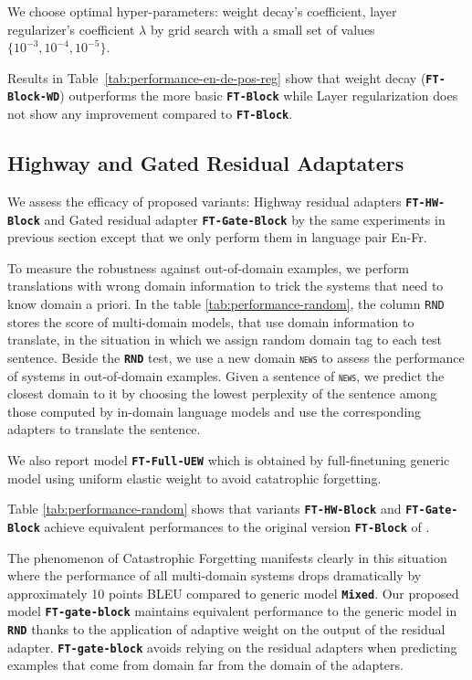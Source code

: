 \documentclass[11pt,a4paper]{article}
\newcommand{\fyTodo}[1]{\Todo[FY:]{\textcolor{orange}{#1}}}
\newcommand{\domain}[1]{\texttt{\textsc{#1}}}
\newcommand{\system}[1]{\texttt{\textbf{#1}}}
\begin{document}
We choose optimal hyper-parameters: weight decay's coefficient, layer regularizer's coefficient $\lambda$ by grid search with a small set of values $\{ 10^{-3}, 10^{-4}, 10^{-5} \}$.

Results in Table~\ref{tab:performance-en-de-pos-reg} show that weight decay (\system{FT-Block-WD}) outperforms the more basic \system{FT-Block} while Layer regularization does not show any improvement compared to \system{FT-Block}.
\fyTodo{How is the weight decay parameter set ?}

\subsection{Highway and Gated Residual Adaptaters \label{ssec:gate-exp}}

We assess the efficacy of proposed variants: Highway residual adapters \system{FT-HW-Block} and Gated residual adapter \system{FT-Gate-Block} by the same experiments in previous section except that we only perform them in language pair En-Fr.

To measure the robustness against out-of-domain examples, we perform translations with wrong domain information to trick the systems that need to know domain a priori. In the table \ref{tab:performance-random}, the column \domain{RND} stores the score of multi-domain models, that use domain information to translate, in the situation in which we assign random domain tag to each test sentence. Beside the \system{RND} test, we use a new domain \domain{news} to assess the performance of systems in out-of-domain examples. Given a sentence of \domain{news}, we predict the closest domain to it by choosing the lowest perplexity of the sentence among those computed by in-domain language models and use the corresponding adapters to translate the sentence.

We also report model \system{FT-Full-UEW} which is obtained by full-finetuning generic model using uniform elastic weight to avoid catatrophic forgetting.

Table \ref{tab:performance-random} shows that variants \system{FT-HW-Block} and \system{FT-Gate-Block} achieve equivalent performances to the original version \system{FT-Block} of \cite{Bapna19simple}.

The phenomenon of Catastrophic Forgetting manifests clearly in this situation where the performance of all multi-domain systems drops dramatically by approximately 10 points BLEU compared to generic model \system{Mixed}. Our proposed model \system{FT-gate-block} maintains equivalent performance to the generic model in \system{RND} thanks to the application of adaptive weight on the output of the residual adapter. \system{FT-gate-block} avoids relying on the residual adapters when predicting examples that come from domain far from the domain of the adapters. 
\end{document}
